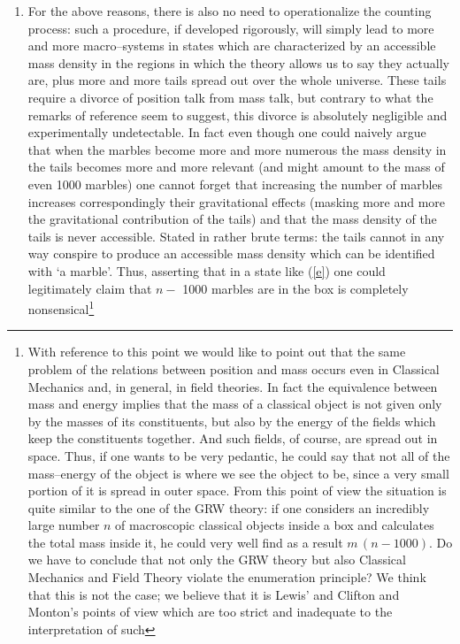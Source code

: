 \documentclass[12pt]{article}
\begin{document}
\begin{enumerate}
\item For the above reasons, there is also no need to
operationalize the counting process: such a procedure, if
developed rigorously, will simply lead to more and more
macro--systems in states which are characterized by an accessible
mass density in the regions in which the theory allows us to say
they actually are, plus more and more tails spread out over the
whole universe. These tails require a divorce of position talk
from mass talk,  but contrary to what the remarks of reference
\cite{cli2} seem to suggest, this divorce is absolutely negligible
and experimentally undetectable. In fact even though one could
naively argue that when the marbles become more and more numerous
the mass density in the tails becomes more and more relevant (and
might amount to the mass of even 1000 marbles) one cannot forget
that increasing the number of marbles increases correspondingly
their gravitational effects (masking more and more the
gravitational contribution of the tails) and that the mass density
of the tails is never accessible. Stated in rather brute terms:
the tails cannot in any way conspire to produce an accessible mass
density which can be identified with `a marble'. Thus, asserting
that in a state like (\ref{e}) one could legitimately claim that
$n-$ 1000 marbles are in the box is completely
nonsensical\footnote{With reference to this point we would like to
point out that the same problem of the relations between position
and mass occurs even in Classical Mechanics and, in general, in
field theories. In fact the equivalence between mass and energy
implies that the mass of a classical object is not given only by
the masses of its constituents, but also by the energy of the
fields which keep the constituents together. And such fields, of
course, are spread out in space. Thus, if one wants to be very
pedantic, he could say that not all of the mass--energy of the
object is where we see the object to be, since a very small
portion of it is spread in outer space. From this point of view
the situation is quite similar to the one of the GRW theory: if
one considers an incredibly large number $n$ of macroscopic
classical objects inside a box and calculates the total mass
inside it, he could very well find as a result $m\,(n-1000)$. Do
we have to conclude that not only the GRW theory but also
Classical Mechanics and Field Theory violate the enumeration
principle? We think that this is not the case; we believe that it
is Lewis' and Clifton and Monton's points of view which are too
 strict and inadequate to the interpretation of such
}
\end{enumerate}
\end{document}
